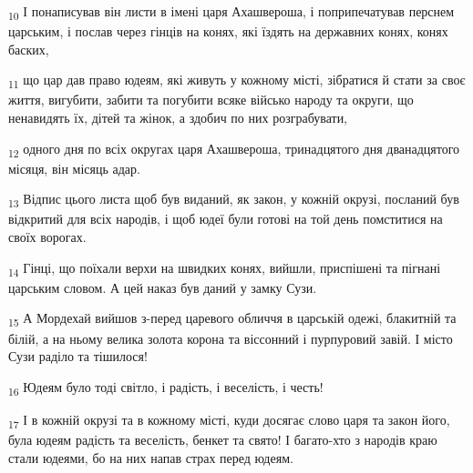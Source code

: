 \begin{tcolorbox}
\textsubscript{10} І понаписував він листи в імені царя Ахашвероша, і поприпечатував перснем царським, і послав через гінців на конях, які їздять на державних конях, конях баских,
\end{tcolorbox}
\begin{tcolorbox}
\textsubscript{11} що цар дав право юдеям, які живуть у кожному місті, зібратися й стати за своє життя, вигубити, забити та погубити всяке військо народу та округи, що ненавидять їх, дітей та жінок, а здобич по них розграбувати,
\end{tcolorbox}
\begin{tcolorbox}
\textsubscript{12} одного дня по всіх округах царя Ахашвероша, тринадцятого дня дванадцятого місяця, він місяць адар.
\end{tcolorbox}
\begin{tcolorbox}
\textsubscript{13} Відпис цього листа щоб був виданий, як закон, у кожній окрузі, посланий був відкритий для всіх народів, і щоб юдеї були готові на той день помститися на своїх ворогах.
\end{tcolorbox}
\begin{tcolorbox}
\textsubscript{14} Гінці, що поїхали верхи на швидких конях, вийшли, приспішені та пігнані царським словом. А цей наказ був даний у замку Сузи.
\end{tcolorbox}
\begin{tcolorbox}
\textsubscript{15} А Мордехай вийшов з-перед царевого обличчя в царській одежі, блакитній та білій, а на ньому велика золота корона та віссонний і пурпуровий завій. І місто Сузи раділо та тішилося!
\end{tcolorbox}
\begin{tcolorbox}
\textsubscript{16} Юдеям було тоді світло, і радість, і веселість, і честь!
\end{tcolorbox}
\begin{tcolorbox}
\textsubscript{17} І в кожній окрузі та в кожному місті, куди досягає слово царя та закон його, була юдеям радість та веселість, бенкет та свято! І багато-хто з народів краю стали юдеями, бо на них напав страх перед юдеям.
\end{tcolorbox}
